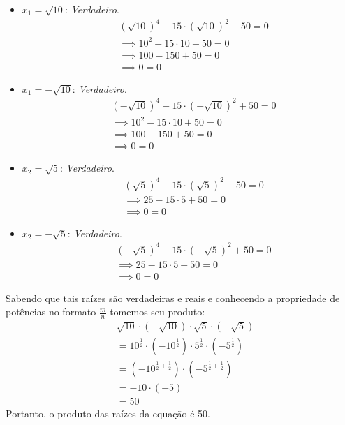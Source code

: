 \begin{itemize}
    \item $x_1 = \sqrt{10}$: \emph{Verdadeiro}.
    \begin{align*}
        &(\sqrt{10})^4 - 15 \cdot (\sqrt{10})^2 + 50 = 0 \\ & \implies
        10^2 - 15 \cdot 10 + 50 = 0 \\ & \implies
        100 - 150 + 50 = 0 \\ & \implies
        0 = 0
    \end{align*}
    \item $x_1 = -\sqrt{10}$: \emph{Verdadeiro}.
    \begin{align*}
        &(-\sqrt{10})^4 - 15 \cdot (-\sqrt{10})^2 + 50 = 0 \\ & \implies
        10^2 - 15 \cdot 10 + 50 = 0 \\ & \implies
        100 - 150 + 50 = 0 \\ & \implies
        0 = 0
    \end{align*}
    \item $x_2 = \sqrt{5}$: \emph{Verdadeiro}.
    \begin{align*}
        &(\sqrt{5})^4 - 15 \cdot (\sqrt{5})^2 + 50 = 0 \\ & \implies 
        25 - 15 \cdot 5 + 50 = 0 \\ & \implies
        0 = 0
    \end{align*}
    \item $x_2 = -\sqrt{5}$: \emph{Verdadeiro}.
    \begin{align*}
        &(-\sqrt{5})^4 - 15 \cdot (-\sqrt{5})^2 + 50 = 0 \\ & \implies 
        25 - 15 \cdot 5 + 50 = 0 \\ & \implies
        0 = 0
    \end{align*}
\end{itemize}
Sabendo que tais raízes são verdadeiras e reais e conhecendo a propriedade de potências no formato $\frac{m}{n}$ tomemos seu produto:
\begin{align*}
    &\sqrt{10} \cdot (-\sqrt{10}) \cdot \sqrt{5} \cdot (-\sqrt{5}) \\ &= 
    10^{\frac{1}{2}} \cdot (-10^{\frac{1}{2}}) \cdot 5^{\frac{1}{2}} \cdot (-5^{\frac{1}{2}}) \\ &=
    (-10^{\frac{1}{2} + \frac{1}{2}}) \cdot (-5^{\frac{1}{2} + \frac{1}{2}}) \\ &=
    -10 \cdot (-5) \\ &=
    50
\end{align*}
Portanto, o produto das raízes da equação é 50.